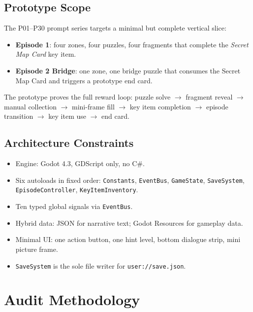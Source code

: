 \documentclass[12pt, a4paper]{article}
\begin{document}
\subsection{Prototype Scope}

The P01--P30 prompt series targets a minimal but complete vertical slice:

\begin{itemize}
  \item \textbf{Episode 1}: four zones, four puzzles, four fragments that
        complete the \textit{Secret Map Card} key item.
  \item \textbf{Episode 2 Bridge}: one zone, one bridge puzzle that consumes
        the Secret Map Card and triggers a prototype end card.
\end{itemize}

The prototype proves the full reward loop: puzzle solve $\to$ fragment reveal
$\to$ manual collection $\to$ mini-frame fill $\to$ key item completion $\to$
episode transition $\to$ key item use $\to$ end card.

\subsection{Architecture Constraints}

\begin{itemize}[nosep]
  \item Engine: Godot 4.3, GDScript only, no C\#.
  \item Six autoloads in fixed order:
        \texttt{Constants}, \texttt{EventBus}, \texttt{GameState},
        \texttt{SaveSystem}, \texttt{EpisodeController}, \texttt{KeyItemInventory}.
  \item Ten typed global signals via \texttt{EventBus}.
  \item Hybrid data: JSON for narrative text; Godot Resources for gameplay data.
  \item Minimal UI: one action button, one hint level, bottom dialogue strip,
        mini picture frame.
  \item \texttt{SaveSystem} is the sole file writer for \texttt{user://save.json}.
\end{itemize}

\section{Audit Methodology}
\end{document}
